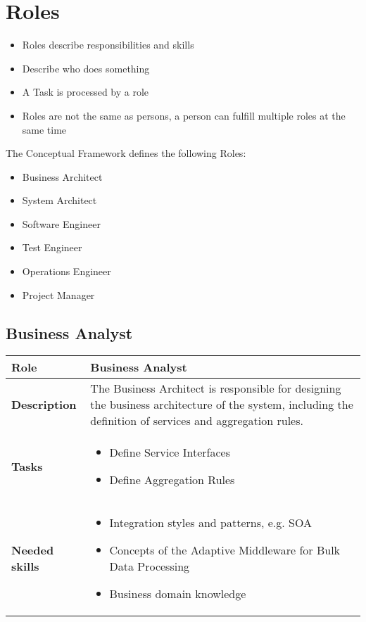 \section{Roles} 

\begin{itemize}
	\item Roles describe responsibilities and skills
	\item Describe who does something
	\item A Task is processed by a role
	\item Roles are not the same as persons, a person can fulfill multiple roles at the same time
\end{itemize}

The Conceptual Framework defines the following Roles:
\begin{itemize}
	\item Business Architect
	\item System Architect 
	\item Software Engineer
	\item Test Engineer
	\item Operations Engineer
	\item Project Manager
\end{itemize}

\subsection{Business Analyst}
\begin{minipage}{\textwidth}
 \label{table:ch6_Role_Business_Analysist}
\begin{tabular}
	{|m{2cm}|m{10cm}|} \hline \bfseries Role & Business Analyst\\
	\hline \bfseries Description & The Business Architect is responsible for designing the business architecture of the system, including the definition of services and aggregation rules.\\
	\hline \bfseries Tasks & 
	\begin{itemize}
		\item Define Service Interfaces
		\item Define Aggregation Rules
	\end{itemize}
	\\
	\hline 
	\bfseries Needed skills &
	\begin{itemize}
		\item Integration styles and patterns, e.g. \ac{SOA}
		\item Concepts of the Adaptive Middleware for Bulk Data Processing
		\item Business domain knowledge
	\end{itemize}
	\\
	\hline
\end{tabular}
\end{minipage}

